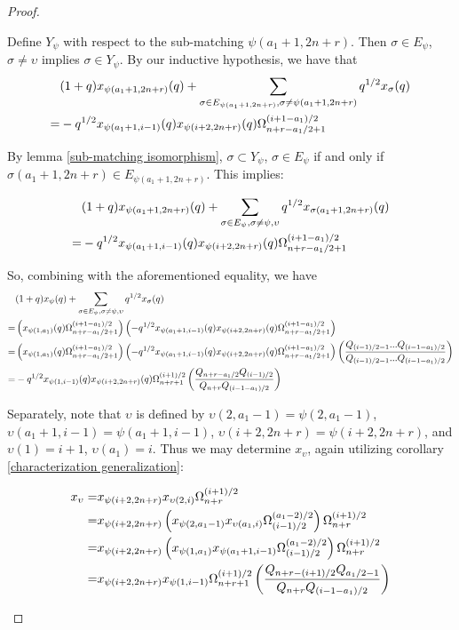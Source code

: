 \documentclass{amsart}
\begin{document}
\begin{proof}
\begin{enumerate}[label={\textit{Case \arabic*.}}]
 		Define $Y_\psi$ with respect to the sub-matching $\psi(a_1+1,2n+r)$. Then $\sigma\in E_\psi$, $\sigma\not=\upsilon$ implies $\sigma\in Y_\psi$. By our inductive hypothesis, we have that 
 		\begin{align*}
 			&(1+q)x_{\psi(a_1+1,2n+r)}(q)+\sum_{\sigma\in E_{\psi(a_1+1,2n+r)},\sigma\not=\psi(a_1+1,2n+r)}q^{1/2}x_{\sigma}(q)\\
 			=&-q^{1/2}x_{\psi(a_1+1,i-1)}(q)x_{\psi(i+2,2n+r)}(q)\Omega_{n+r-a_1/2+1}^{(i+1-a_1)/2}
 		\end{align*}
 		
 		
 		By lemma \ref{sub-matching isomorphism}, $\sigma\subset Y_\psi$, $\sigma\in E_\psi$ if and only if $\sigma(a_1+1,2n+r)\in E_{\psi(a_1+1,2n+r)}$. This implies:
 		
 		\begin{align*}
 			&(1+q)x_{\psi(a_1+1,2n+r)}(q)+\sum_{\sigma\in E_\psi,\sigma\not=\psi,\upsilon}q^{1/2}x_{\sigma(a_1+1,2n+r)}(q)\\
 			=&-q^{1/2}x_{\psi(a_1+1,i-1)}(q)x_{\psi(i+2,2n+r)}(q)\Omega_{n+r-a_1/2+1}^{(i+1-a_1)/2}
 		\end{align*}
 		
 		So, combining with the aforementioned equality, we have 
 		\begin{align*}
 			&(1+q)x_\psi(q)+\sum_{\sigma\in E_\psi,\sigma\not=\psi,\upsilon}q^{1/2}x_\sigma(q)\\
 			=&\left( x_{\psi(1,a_1)}(q)\Omega_{n+r-a_1/2+1}^{(i+1-a_1)/2} \right)\left( -q^{1/2}x_{\psi(a_1+1,i-1)}(q)x_{\psi(i+2,2n+r)}(q)\Omega_{n+r-a_1/2+1}^{(i+1-a_1)/2} \right)\\
 			=&\left( x_{\psi(1,a_1)}(q)\Omega_{n+r-a_1/2+1}^{(i+1-a_1)/2} \right)\left( -q^{1/2}x_{\psi(a_1+1,i-1)}(q)x_{\psi(i+2,2n+r)}(q)\Omega_{n+r-a_1/2+1}^{(i+1-a_1)/2} \right)\left( \frac{Q_{(i-1)/2-1}...Q_{(i-1-a_1)/2}}{Q_{(i-1)/2-1}...Q_{(i-1-a_1)/2}} \right)\\
 			=&-q^{1/2}x_{\psi(1,i-1)}(q)x_{\psi(i+2,2n+r)}(q)\Omega_{n+r+1}^{(i+1)/2}\left( \frac{Q_{n+r-a_1/2}Q_{(i-1)/2}}{Q_{n+r}Q_{(i-1-a_1)/2}} \right)
 		\end{align*}
 		
 		Separately, note that $\upsilon$ is defined by $\upsilon(2,a_1-1)=\psi(2,a_1-1)$, $\upsilon(a_1+1,i-1)=\psi(a_1+1,i-1)$, $\upsilon(i+2,2n+r)=\psi(i+2,2n+r)$, and $\upsilon(1)=i+1$, $\upsilon(a_1)=i$. Thus we may determine $x_\upsilon$, again utilizing corollary \ref{characterization generalization}:
 		
 		\begin{align*}
 			x_\upsilon=&x_{\psi(i+2,2n+r)}x_{\upsilon(2,i)}\Omega_{n+r}^{(i+1)/2}\\
 			=&x_{\psi(i+2,2n+r)}\left( x_{\psi(2,a_1-1)}x_{\upsilon(a_1,i)}\Omega_{(i-1)/2}^{(a_1-2)/2} \right)\Omega_{n+r}^{(i+1)/2}\\
 			=&x_{\psi(i+2,2n+r)}\left( x_{\psi(1,a_1)}x_{\psi(a_1+1,i-1)}\Omega_{(i-1)/2}^{(a_1-2)/2} \right)\Omega_{n+r}^{(i+1)/2}\\
 			=&x_{\psi(i+2,2n+r)}x_{\psi(1,i-1)}\Omega_{n+r+1}^{(i+1)/2}\left( \frac{Q_{n+r-(i+1)/2}Q_{a_1/2-1}}{Q_{n+r}Q_{(i-1-a_1)/2}} \right)
 		\end{align*}
 		

\end{enumerate}
\end{proof}
\end{document}
